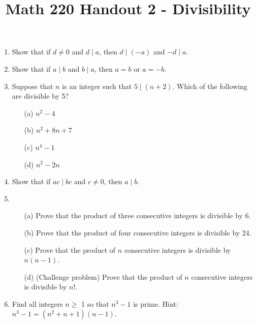 \documentclass[12pt, reqno]{amsart}
\begin{document}
\title[Math 220 Handout 2 - Divisibility]{Math 220 Handout 2 - Divisibility}\maketitle

\begin{enumerate}

\item Show that if $d \neq 0$ and $d\mid a$, then $d\mid(-a)$ and $-d\mid a$.

\item Show that if $a\mid b$ and $b\mid a$, then $a=b$ or $a=-b$.

\item Suppose that $n$ is an integer such that $5\mid (n + 2)$. Which of the following are divisible by 5? 
 \begin{enumerate}
 \item [(a)] $n^2 -4$
 \item [(b)] $n^2 +8n+7$
 \item [(c)] $n^4 -1$
 \item [(d)] $n^2 - 2n$ \end{enumerate} 

\item Show that if $ ac\mid bc$ and $c \neq 0$, then $a\mid b$.

\vspace{15pt}

\item 
  \begin{enumerate}
 \item [(a)] Prove that the product of three consecutive integers is divisible by 6.
 \item [(b)] Prove that the product of four consecutive integers is divisible by 24.
 \item [(c)] Prove that the product of $n$ consecutive integers is divisible by $n(n-1)$.
 \item [(d)] (Challenge problem) Prove that the product of $n$ consecutive integers is divisible by $n!$.
 
 
 \end{enumerate}

\item Find all integers $n \geq$ 1 so that $n^3 -1$ is prime. Hint: $n^3 -1 = (n^2 +n+1)(n-1)$. 


\end{enumerate}
\end{document}
